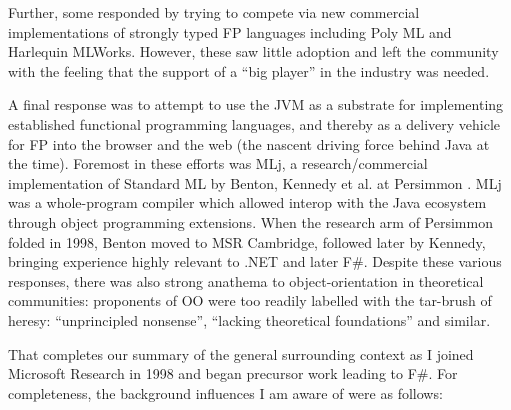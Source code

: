 \documentclass[acmsmall]{acmart}\settopmatter{}
\begin{document}
Further, some responded by trying to compete via new commercial implementations of strongly typed FP languages including Poly ML and Harlequin MLWorks. However,
these saw little adoption and left the community with the feeling that the support of a “big player” in the industry was needed. 

A final response was to attempt to use the JVM as a substrate for implementing established functional programming languages, and thereby as a delivery
vehicle for FP into the browser and the web (the nascent driving force behind Java at the time).  Foremost in these efforts was MLj, a research/commercial
implementation of Standard ML by Benton, Kennedy et al. at Persimmon \citep{Benton1999}.  MLj was a whole-program compiler which allowed interop with the Java ecosystem through object programming extensions. When the research
arm of Persimmon folded in 1998, Benton moved to MSR Cambridge, followed later by Kennedy, bringing experience highly relevant to .NET and later F\#. Despite
these various responses, there was also strong anathema to object-orientation in theoretical communities: proponents of OO were too readily labelled with the
tar-brush of heresy: “unprincipled nonsense”, “lacking theoretical foundations” and similar.  

That completes our summary of the general surrounding context as I joined Microsoft Research in 1998 and began precursor work leading to F\#. For completeness,
the background influences I am aware of were as follows:
\end{document}

